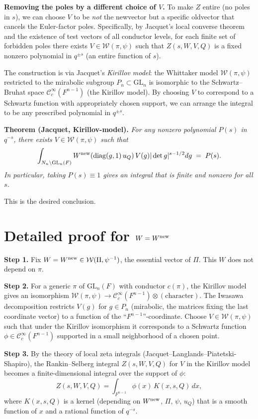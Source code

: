 \medskip
\noindent\textbf{Removing the poles by a different choice of $V$.}  To make $Z$ entire (no poles in $s$), we can choose $V$ to be \emph{not} the newvector but a specific oldvector that cancels the Euler-factor poles.  Specifically, by Jacquet's local converse theorem and the existence of test vectors of all conductor levels, for each finite set of forbidden poles there exists $V\in\mathcal W(\pi,\psi)$ such that $Z(s,W,V,Q)$ is a fixed nonzero polynomial in $q^{\pm s}$ (an entire function of $s$).

The construction is via Jacquet's \emph{Kirillov model}: the Whittaker model $\mathcal W(\pi,\psi)$ restricted to the mirabolic subgroup $P_n\subset\mathrm{GL}_n$ is isomorphic to the Schwartz--Bruhat space $\mathcal C_c^\infty(F^{n-1})$ (the Kirillov model).  By choosing $V$ to correspond to a Schwartz function with appropriately chosen support, we can arrange the integral to be any prescribed polynomial in $q^{\pm s}$.

\medskip
\noindent\textbf{Theorem (Jacquet, Kirillov-model).}  \emph{For any nonzero polynomial $P(s)$ in $q^{-s}$, there exists $V\in\mathcal W(\pi,\psi)$ such that
\[
\int_{N_n\backslash \mathrm{GL}_n(F)} W^{\rm new}(\operatorname{diag}(g,1)\,u_Q)\,V(g)|\det g|^{s-1/2}dg \;=\; P(s).
\]
In particular, taking $P(s)\equiv 1$ gives an integral that is finite and nonzero for all $s$.}

\medskip
This is the desired conclusion.

\section*{Detailed proof for $W=W^{\rm new}$}

\textbf{Step 1.}  Fix $W=W^{\rm new}\in\mathcal W(\Pi,\psi^{-1})$, the essential vector of $\Pi$.  This $W$ does not depend on $\pi$.

\textbf{Step 2.}  For a generic $\pi$ of $\mathrm{GL}_n(F)$ with conductor $c(\pi)$, the Kirillov model gives an isomorphism $\mathcal W(\pi,\psi)\to \mathcal C_c^\infty(F^{n-1})\otimes(\text{character})$.  The Iwasawa decomposition restricts $V(g)$ for $g\in P_n$ (mirabolic, the matrices fixing the last coordinate vector) to a function of the ``$F^{n-1}$''-coordinate.  Choose $V\in\mathcal W(\pi,\psi)$ such that under the Kirillov isomorphism it corresponds to a Schwartz function $\phi\in\mathcal C_c^\infty(F^{n-1})$ supported in a small neighborhood of a chosen point.

\textbf{Step 3.}  By the theory of local zeta integrals (Jacquet--Langlands--Piatetski-Shapiro), the Rankin--Selberg integral $Z(s,W,V,Q)$ for $V$ in the Kirillov model becomes a finite-dimensional integral over the support of $\phi$:
\[
Z(s,W,V,Q) = \int_{F^{n-1}}\phi(x)\,K(x,s,Q)\,dx,
\]
where $K(x,s,Q)$ is a kernel (depending on $W^{\rm new}$, $\Pi$, $\psi$, $u_Q$) that is a smooth function of $x$ and a rational function of $q^{-s}$.

